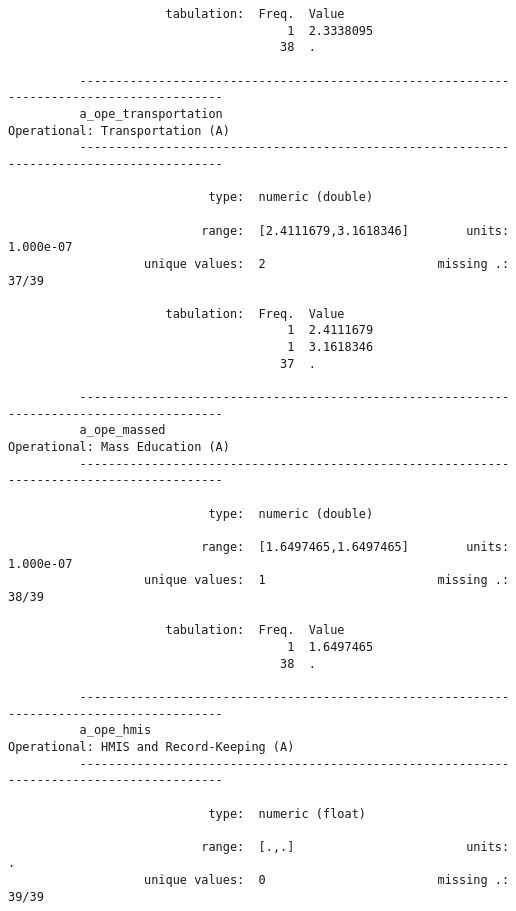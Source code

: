 \documentclass{article}
\begin{document}
\begin{verbatim}
                      tabulation:  Freq.  Value
                                       1  2.3338095
                                      38  .
          
          ------------------------------------------------------------------------------------------
          a_ope_transportation                                       Operational: Transportation (A)
          ------------------------------------------------------------------------------------------
          
                            type:  numeric (double)
          
                           range:  [2.4111679,3.1618346]        units:  1.000e-07
                   unique values:  2                        missing .:  37/39
          
                      tabulation:  Freq.  Value
                                       1  2.4111679
                                       1  3.1618346
                                      37  .
          
          ------------------------------------------------------------------------------------------
          a_ope_massed                                               Operational: Mass Education (A)
          ------------------------------------------------------------------------------------------
          
                            type:  numeric (double)
          
                           range:  [1.6497465,1.6497465]        units:  1.000e-07
                   unique values:  1                        missing .:  38/39
          
                      tabulation:  Freq.  Value
                                       1  1.6497465
                                      38  .
          
          ------------------------------------------------------------------------------------------
          a_ope_hmis                                        Operational: HMIS and Record-Keeping (A)
          ------------------------------------------------------------------------------------------
          
                            type:  numeric (float)
          
                           range:  [.,.]                        units:  .
                   unique values:  0                        missing .:  39/39
          

\end{verbatim}
\end{document}
